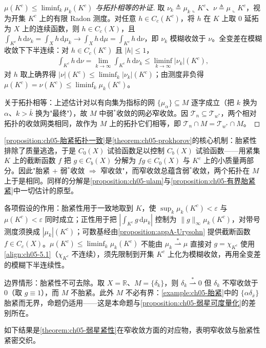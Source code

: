 \documentclass[../../main.tex]{subfiles}%
\begin{document}
\begin{proof}[$\mu(K^c)\leqslant\liminf_k\mu_k(K^c)$ 与拓扑相等的补证]
取 $\nu_k\triangleq\mu_k\llcorner K^c$、$\nu\triangleq\mu\llcorner K^c$，视为开集 $K^c$ 上的有限 Radon 测度。对任意 $h\in C_c(K^c)$，将 $h$ 在 $K$ 上取 $0$ 延拓为 $X$ 上的连续函数，则 $h\in C_c(X)$，且 $\int_{K^c}h\,\mathrm{d}\nu_k=\int_Xh\,\mathrm{d}\mu_k\to\int_Xh\,\mathrm{d}\mu=\int_{K^c}h\,\mathrm{d}\nu$，即 $\nu_k$ 模糊收敛于 $\nu$。全变差在模糊收敛下下半连续：对 $h\in C_c(K^c)$ 且 $|h|\leqslant1$，
\begin{align*}
\int_{K^c}h\,\mathrm{d}\nu=\lim_{k\to\infty}\int_{K^c}h\,\mathrm{d}\nu_k\leqslant\liminf_{k\to\infty}|\nu_k|(K^c),
\end{align*}
对 $h$ 取上确界得 $|\nu|(K^c)\leqslant\liminf_k|\nu_k|(K^c)$；由测度非负得 $\mu(K^c)=\nu(K^c)\leqslant\liminf_k\mu_k(K^c)$。

关于拓扑相等：上述估计对以有向集为指标的网 $\{\mu_\alpha\}\subseteq M$ 逐字成立（把 $k$ 换为 $\alpha$、$k>\bar{k}$ 换为"最终"），故 $M$ 中弱$^*$收敛的网必窄收敛。因 $\mathcal{T}_n\subseteq\mathcal{T}_{w^*}$，两个相对拓扑的收敛网类相同，故作为 $M$ 上的拓扑它们相等，即 $\mathcal{T}_n\cap M=\mathcal{T}_{w^*}\cap M$。
\end{proof}

\begin{remark}\label{remark:ch05-胎紧拓扑一致动机}
\cref{proposition:ch05-胎紧拓扑一致}是\cref{theorem:ch05-prokhorov}的核心机制：胎紧性排除了质量逃逸，于是 $C_0(X)$ 试验函数足以控制 $C_b(X)$ 试验函数——用紧集 $K$ 上的截断函数 $f$ 把 $g\in C_b(X)$ 分解为 $fg\in C_0(X)$ 与 $K^c$ 上的小质量两部分。因此"胎紧 + 弱$^*$收敛 $\Rightarrow$ 窄收敛"，而窄收敛总蕴含弱$^*$收敛，两个拓扑在 $M$ 上于是相同。同样的分解是\cref{proposition:ch05-ulam}与\cref{proposition:ch05-有界胎紧紧}中一切估计的原型。

各项假设的作用：胎紧性用于一致地取到 $K$，使 $\sup_k\mu_k(K^c)<\varepsilon$ 与 $\mu(K^c)<\varepsilon$ 同时成立；正性用于把 $|\int_{K^c}g\,\mathrm{d}\mu_k|$ 控制为 $\|g\|_\infty\mu_k(K^c)$，对带号测度须换成 $|\mu_k|(K^c)$；可数基经由\cref{proposition:appA-Urysohn} 提供截断函数 $f\in C_c(X)$。$\mu(K^c)\leqslant\liminf_k\mu_k(K^c)$ 不能由 $\mu_k\stackrel{*}{\rightharpoonup}\mu$ 直接对 $g=\chi_{K^c}$ 使用\eqref{align:ch05-5.1}（$\chi_{K^c}$ 不连续），须先限制到开集 $K^c$ 上化为模糊收敛，再用全变差的模糊下半连续性。

边界情形：胎紧性不可去除。取 $X=\mathbb{R}$、$M=\{\delta_k\}$，则 $\delta_k\stackrel{*}{\rightharpoonup}0$ 但 $\delta_k$ 不窄收敛于 $0$（取 $g\equiv1$），而 $M$ 不胎紧。此外 $M$ 不必有界：\cref{example:ch05-胎紧}中的 $\{\alpha\delta_{\bar x}\}$ 胎紧而无界，命题仍适用——这是本命题与\cref{proposition:ch05-弱星可度量化}的差别所在。
\end{remark}
如下结果是\cref{theorem:ch05-弱星紧性}在窄收敛方面的对应物，表明窄收敛与胎紧性紧密交织。
\end{document}
